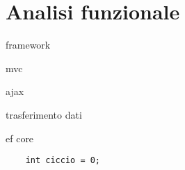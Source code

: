 \section{Analisi funzionale}
framework

mvc 

ajax

trasferimento dati

ef core

\begin{verbatim}
    int ciccio = 0;
\end{verbatim}